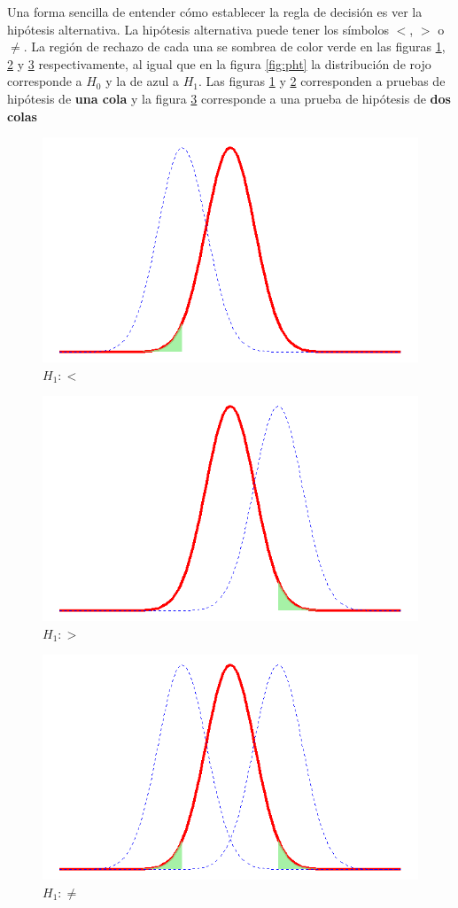 \documentclass[]{book}
\begin{document}
Una forma sencilla de entender cómo establecer la regla de decisión es ver la hipótesis alternativa. La hipótesis alternativa puede tener los símbolos \(<\), \(>\) o \(\neq\). La región de rechazo de cada una se sombrea de color verde en las figuras \ref{fig:phless}, \ref{fig:phmore} y \ref{fig:ph2c} respectivamente, al igual que en la figura \ref{fig:pht} la distribución de rojo corresponde a \(H_0\) y la de azul a \(H_1\). Las figuras \ref{fig:phless} y \ref{fig:phmore} corresponden a pruebas de hipótesis de \textbf{una cola} y la figura \ref{fig:ph2c} corresponde a una prueba de hipótesis de \textbf{dos colas}

\begin{figure}[h!]

{\centering \includegraphics[width=0.6\linewidth]{phless} 

}

\caption{$H_1:<$}\label{fig:phless}
\end{figure}

\begin{figure}[h!]

{\centering \includegraphics[width=0.6\linewidth]{phmore} 

}

\caption{$H_1:>$}\label{fig:phmore}
\end{figure}

\begin{figure}[h!]

{\centering \includegraphics[width=0.6\linewidth]{ph2c} 

}

\caption{$H_1:\neq$}\label{fig:ph2c}
\end{figure}
\end{document}
